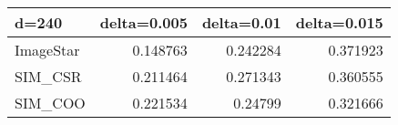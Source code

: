 \begin{tabular}{lrrr}
\hline
 d=240     &   delta=0.005 &   delta=0.01 &   delta=0.015 \\
\hline
 ImageStar &      0.148763 &     0.242284 &      0.371923 \\
 SIM\_CSR   &      0.211464 &     0.271343 &      0.360555 \\
 SIM\_COO   &      0.221534 &     0.24799  &      0.321666 \\
\hline
\end{tabular}
